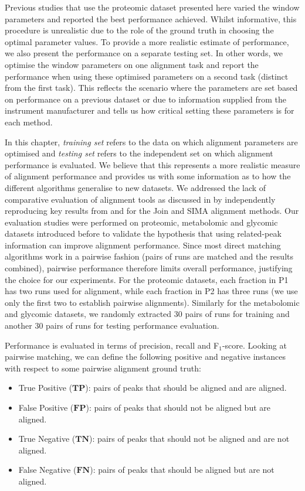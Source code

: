 Previous studies that use the proteomic dataset presented here \cite{Lange2008,Ballardini2011,Voss2011a} varied the window parameters and reported the best performance achieved. Whilst informative, this procedure is unrealistic due to the role of the ground truth in choosing the optimal parameter values. To provide a more realistic estimate of performance, we also present the performance on a separate testing set. In other words, we optimise the window parameters on one alignment task and report the performance when using these optimised parameters on a second task (distinct from the first task). This reflects the scenario where the parameters are set based on performance on a previous dataset or due to information supplied from the instrument manufacturer and tells us how critical setting these parameters is for each method. 

In this chapter, \emph{training set} refers to the data on which alignment parameters are optimised and \emph{testing set} refers to the independent set on which alignment performance is evaluated. We believe that this represents a more realistic measure of alignment performance and provides us with some information as to how the different algorithms generalise to new datasets. We addressed the lack of comparative evaluation of alignment tools as discussed in \cite{Smith2013} by independently reproducing key results from \cite{Lange2008} and \cite{Voss2011a} for the Join and SIMA alignment methods. Our evaluation studies were performed on proteomic, metabolomic and glycomic datasets introduced before to validate the hypothesis that using related-peak information can improve alignment performance. Since most direct matching algorithms work in a pairwise fashion (pairs of runs are matched and the results combined), pairwise performance therefore limits overall performance, justifying the choice for our experiments. For the proteomic datasets, each fraction in P1 has two runs used for alignment, while each fraction in P2 has three runs (we use only the first two to establish pairwise alignments). Similarly for the metabolomic and glycomic datasets, we randomly extracted 30 pairs of runs for training and another 30 pairs of runs for testing performance evaluation.

Performance is evaluated in terms of precision, recall and F$_1$-score. Looking at pairwise matching, we can define the following positive and negative instances with respect to some pairwise alignment ground truth:

\begin{itemize}
\item True Positive ($\boldsymbol{TP}$): pairs of peaks that should be aligned and are aligned.
\item False Positive ($\boldsymbol{FP}$): pairs of peaks that should not be aligned but are aligned.
\item True Negative ($\boldsymbol{TN}$): pairs of peaks that should not be aligned and are not aligned.
\item False Negative ($\boldsymbol{FN}$): pairs of peaks that should be aligned but are not aligned.
\end{itemize}

